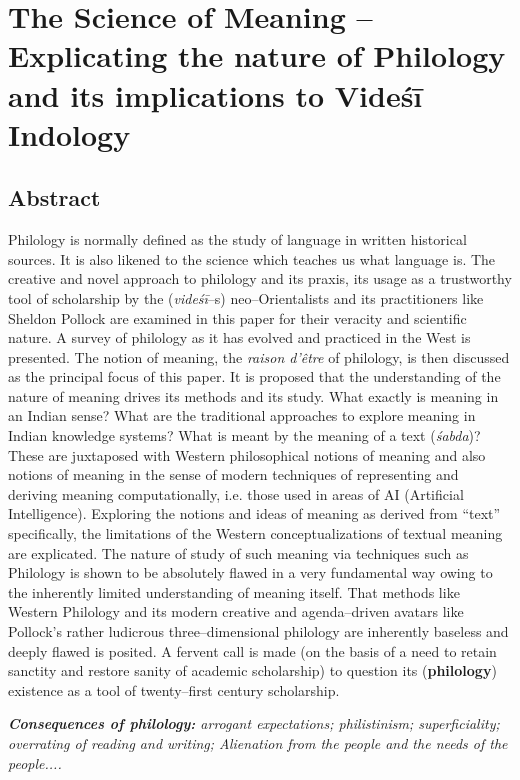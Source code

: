 
\chapter{The Science of Meaning – Explicating the nature of Philology and its implications to Videśī Indology}



\section*{Abstract}

Philology is normally defined as the study of language in written historical sources. It is also likened to the science which teaches us what language is. The creative and novel approach to philology and its praxis, its usage as a trustworthy tool of scholarship by the (\textit{videśī}–s) neo–Orientalists and its practitioners like Sheldon Pollock are examined in this paper for their veracity and scientific nature. A survey of philology as it has evolved and practiced in the West is presented. The notion of meaning, the \textit{raison d’être} of philology, is then discussed as the principal focus of this paper. It is proposed that the understanding of the nature of meaning drives its methods and its study. What exactly is meaning in an Indian sense? What are the traditional approaches to explore meaning in Indian knowledge systems? What is meant by the meaning of a text (\textit{śabda})? These are juxtaposed with Western philosophical notions of meaning and also notions of meaning in the sense of modern techniques of representing and deriving meaning computationally, i.e. those used in areas of AI (Artificial Intelligence). Exploring the notions and ideas of meaning as derived from “text” specifically, the limitations of the Western conceptualizations of textual meaning are explicated. The nature of study of such meaning via techniques such as Philology is shown to be absolutely flawed in a very fundamental way owing to the inherently limited understanding of meaning itself. That methods like Western Philology and its modern creative and agenda–driven avatars like Pollock’s rather ludicrous three–dimensional philology are inherently baseless and deeply flawed is posited. A fervent call is made (on the basis of a need to retain sanctity and restore sanity of academic scholarship) to question its (\textbf{philology}) existence as a tool of twenty–first century scholarship.

\textit{\textbf{Consequences of philology:} arrogant expectations; philistinism; superficiality; overrating of reading and writing; Alienation from the people and the needs of the people.... }

